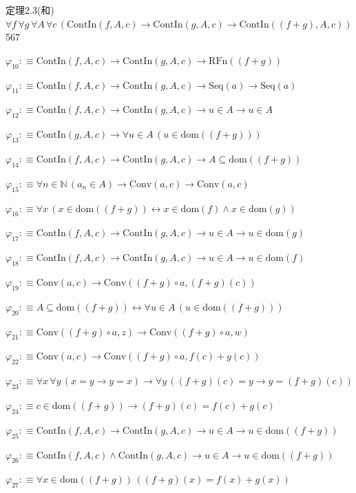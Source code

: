 \begin{fullproof}{定理2.3(和)}{$\forall f\,\forall g\,\forall A\,\forall c\,(\mathrm{ContIn}(f,A,c) \to \mathrm{ContIn}(g,A,c) \to \mathrm{ContIn}((f + g),A,c))$}{567}
\begin{abbrevlist}
\item $\varphi_{10} :\equiv \mathrm{ContIn}(f,A,c) \to \mathrm{ContIn}(g,A,c) \to \mathrm{RFn}((f + g))$
\item $\varphi_{11} :\equiv \mathrm{ContIn}(f,A,c) \to \mathrm{ContIn}(g,A,c) \to \mathrm{Seq}(a) \to \mathrm{Seq}(a)$
\item $\varphi_{12} :\equiv \mathrm{ContIn}(f,A,c) \to \mathrm{ContIn}(g,A,c) \to u \in A \to u \in A$
\item $\varphi_{13} :\equiv \mathrm{ContIn}(g,A,c) \to \forall u \in A\,(u \in \mathrm{dom}((f + g)))$
\item $\varphi_{14} :\equiv \mathrm{ContIn}(f,A,c) \to \mathrm{ContIn}(g,A,c) \to A \subseteq \mathrm{dom}((f + g))$
\item $\varphi_{15} :\equiv \forall n \in \mathbb{N}\,(a_{n} \in A) \to \mathrm{Conv}(a,c) \to \mathrm{Conv}(a,c)$
\item $\varphi_{16} :\equiv \forall x\,(x \in \mathrm{dom}((f + g)) \leftrightarrow x \in \mathrm{dom}(f) \land x \in \mathrm{dom}(g))$
\item $\varphi_{17} :\equiv \mathrm{ContIn}(f,A,c) \to \mathrm{ContIn}(g,A,c) \to u \in A \to u \in \mathrm{dom}(g)$
\item $\varphi_{18} :\equiv \mathrm{ContIn}(f,A,c) \to \mathrm{ContIn}(g,A,c) \to u \in A \to u \in \mathrm{dom}(f)$
\item $\varphi_{19} :\equiv \mathrm{Conv}(a,c) \to \mathrm{Conv}((f + g) \circ a,(f + g)(c))$
\item $\varphi_{20} :\equiv A \subseteq \mathrm{dom}((f + g)) \leftrightarrow \forall u \in A\,(u \in \mathrm{dom}((f + g)))$
\item $\varphi_{21} :\equiv \mathrm{Conv}((f + g) \circ a,z) \to \mathrm{Conv}((f + g) \circ a,w)$
\item $\varphi_{22} :\equiv \mathrm{Conv}(a,c) \to \mathrm{Conv}((f + g) \circ a,f(c) + g(c))$
\item $\varphi_{23} :\equiv \forall x\,\forall y\,(x = y \to y = x) \to \forall y\,((f + g)(c) = y \to y = (f + g)(c))$
\item $\varphi_{24} :\equiv c \in \mathrm{dom}((f + g)) \to (f + g)(c) = f(c) + g(c)$
\item $\varphi_{25} :\equiv \mathrm{ContIn}(f,A,c) \to \mathrm{ContIn}(g,A,c) \to u \in A \to u \in \mathrm{dom}((f + g))$
\item $\varphi_{26} :\equiv \mathrm{ContIn}(f,A,c) \land \mathrm{ContIn}(g,A,c) \to u \in A \to u \in \mathrm{dom}((f + g))$
\item $\varphi_{27} :\equiv \forall x \in \mathrm{dom}((f + g))\,((f + g)(x) = f(x) + g(x))$

\end{abbrevlist}
\end{fullproof}
